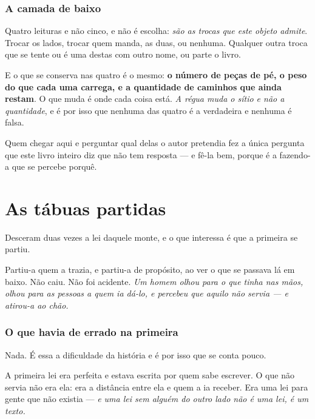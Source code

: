 \documentclass[livro.tex]{subfiles}
\begin{document}
\subsection*{A camada de baixo}

Quatro leituras e não cinco, e não é escolha: \emph{são as trocas que este objeto admite}. Trocar
os lados, trocar quem manda, as duas, ou nenhuma. Qualquer outra troca que se tente ou é uma
destas com outro nome, ou parte o livro.

\medskip

E o que se conserva nas quatro é o mesmo: \textbf{o número de peças de pé, o peso do que cada uma
carrega, e a quantidade de caminhos que ainda restam}. O que muda é onde cada coisa está. \emph{A
régua muda o sítio e não a quantidade}, e é por isso que nenhuma das quatro é a verdadeira e
nenhuma é falsa.

\medskip

Quem chegar aqui e perguntar qual delas o autor pretendia fez a única pergunta que este livro
inteiro diz que não tem resposta --- e fê-la bem, porque é a fazendo-a que se percebe porquê.


\chapter{As tábuas partidas}

Desceram duas vezes a lei daquele monte, e o que interessa é que a primeira se partiu.

\medskip

Partiu-a quem a trazia, e partiu-a de propósito, ao ver o que se passava lá em baixo. Não caiu.
Não foi acidente. \emph{Um homem olhou para o que tinha nas mãos, olhou para as pessoas a quem ia
dá-lo, e percebeu que aquilo não servia --- e atirou-a ao chão.}

\subsection*{O que havia de errado na primeira}

Nada. É essa a dificuldade da história e é por isso que se conta pouco.

\medskip

A primeira lei era perfeita e estava escrita por quem sabe escrever. O que não servia não era ela:
era a distância entre ela e quem a ia receber. Era uma lei para gente que não existia --- \emph{e
uma lei sem alguém do outro lado não é uma lei, é um texto.}
\end{document}
